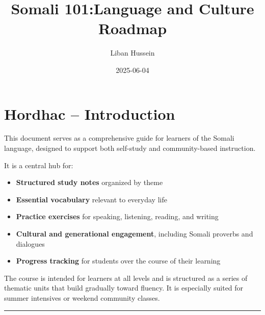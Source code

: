 \documentclass[
  a4paper,
  DIV=11,
  numbers=noendperiod]{scrartcl}
\title{Somali 101:Language and Culture Roadmap}
\author{Liban Hussein}
\date{2025-06-04}
\providecommand{\tightlist}{%
  \setlength{\itemsep}{0pt}\setlength{\parskip}{0pt}}
\renewcommand*\contentsname{Table of contents}
\newcommand\contentsname{Table of contents}
\begin{document}
\maketitle

\renewcommand*\contentsname{Table of contents}
{
\hypersetup{linkcolor=}
\setcounter{tocdepth}{3}
\tableofcontents
}

\section{Hordhac -- Introduction}\label{sec-intro}

This document serves as a comprehensive guide for learners of the Somali
language, designed to support both self-study and community-based
instruction.

It is a central hub for:

\begin{itemize}
\tightlist
\item
  \textbf{Structured study notes} organized by theme\\
\item
  \textbf{Essential vocabulary} relevant to everyday life\\
\item
  \textbf{Practice exercises} for speaking, listening, reading, and
  writing\\
\item
  \textbf{Cultural and generational engagement}, including Somali
  proverbs and dialogues\\
\item
  \textbf{Progress tracking} for students over the course of their
  learning
\end{itemize}

The course is intended for learners at all levels and is structured as a
series of thematic units that build gradually toward fluency. It is
especially suited for summer intensives or weekend community classes.

\begin{center}\rule{0.5\linewidth}{0.5pt}\end{center}
\end{document}
